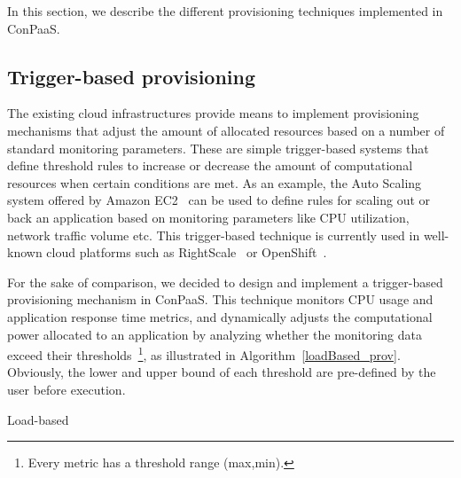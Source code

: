 In this section, we describe the different provisioning techniques implemented in ConPaaS.



\subsection*{Trigger-based provisioning}




The existing cloud infrastructures provide means to implement
provisioning mechanisms that adjust the amount of allocated 
resources based on a number of standard monitoring parameters. 
These are simple trigger-based systems that define threshold 
rules to increase or decrease the amount of computational resources
when certain conditions are met. As an example, the Auto Scaling 
system offered by Amazon EC2~\cite{amazonEC2} can be used to define 
rules for scaling out or back an application based on monitoring
parameters like CPU utilization, network traffic volume etc. 
This trigger-based technique is currently used in well-known 
cloud platforms such as RightScale~\cite{right-scale} or OpenShift~\cite{openshift}. 

For the sake of comparison, we decided to design and implement a 
trigger-based provisioning mechanism in ConPaaS. This technique 
monitors CPU usage and application response time metrics, and 
dynamically adjusts the computational power allocated to an application by analyzing whether the monitoring data exceed their thresholds~\footnote{Every metric has a threshold range (max,min).}, as illustrated in Algorithm~\ref{loadBased_prov}. Obviously, the lower and upper bound of each threshold are pre-defined by the user before execution.

\begin{algorithm}
{\scriptsize
\SetAlgoLined
\SetInd{0mm}{2mm}
\BlankLine
\While{auto-scaling is ON}{
Collect monitoring data of each metric, \emph{data}\;
\BlankLine
\If{ no recent scaling operation}{
\uIf{ avg(data$_i$) $>=$ \emph{threshold\_min}$_i$  }{
ADD resources\;
}
\ElseIf{ avg(data$_i$) $<$ \emph{threshold\_max}$_i$  }{
REMOVE resources\;
} 
} 
Sleep for 5 minutes \; 
}
}
\caption{Load-based}
\label{loadBased_prov}
\end{algorithm}

